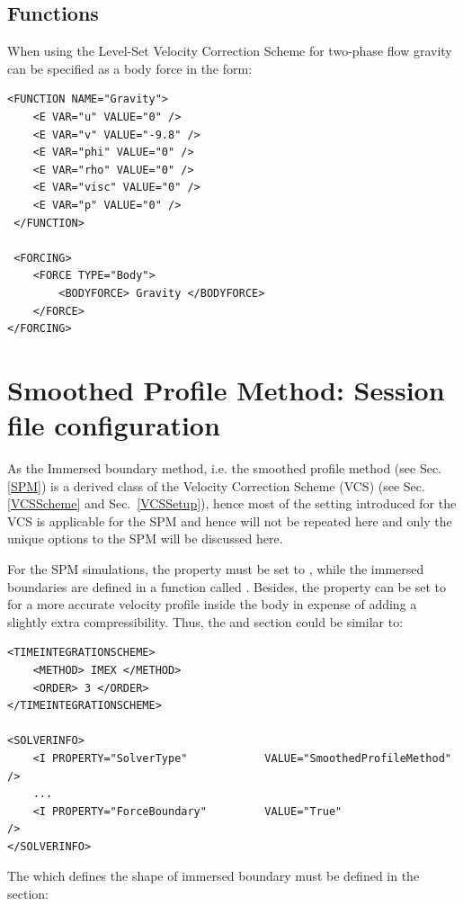 \subsection{Functions}
When using the Level-Set Velocity Correction Scheme for two-phase flow gravity can be specified as a body force in the form:

\begin{lstlisting}[style=XMLStyle]
 <FUNCTION NAME="Gravity">
    <E VAR="u" VALUE="0" />
    <E VAR="v" VALUE="-9.8" />
    <E VAR="phi" VALUE="0" />
    <E VAR="rho" VALUE="0" />
    <E VAR="visc" VALUE="0" />
    <E VAR="p" VALUE="0" />
 </FUNCTION>

 <FORCING>
    <FORCE TYPE="Body">
        <BODYFORCE> Gravity </BODYFORCE>
    </FORCE>
</FORCING>
\end{lstlisting}

\section{Smoothed Profile Method: Session file configuration}
As the Immersed boundary method, i.e. the smoothed profile method (see Sec.~
\ref{SPM}) is a derived class of the Velocity Correction Scheme (VCS) (see Sec.~
\ref{VCSScheme} and Sec.~\ref{VCSSetup}), hence most of the setting introduced 
for the VCS is applicable for the SPM and hence will not be repeated here and
only the unique options to the SPM will be discussed here.

For the SPM simulations, the property 
must be set to , while the immersed boundaries are
defined in a function called . Besides, the property
 can be set to  for a more accurate velocity 
profile inside the body in expense of adding a slightly extra compressibility.
Thus,
the 
and  section could be similar to:

\begin{lstlisting}[style=XMLStyle]
<TIMEINTEGRATIONSCHEME>
    <METHOD> IMEX </METHOD>
    <ORDER> 3 </ORDER>
</TIMEINTEGRATIONSCHEME>

<SOLVERINFO>
    <I PROPERTY="SolverType"            VALUE="SmoothedProfileMethod" />
    ...
    <I PROPERTY="ForceBoundary"         VALUE="True"                  />
</SOLVERINFO>
\end{lstlisting}

The  which defines the shape of immersed boundary must be
defined in the  section:

